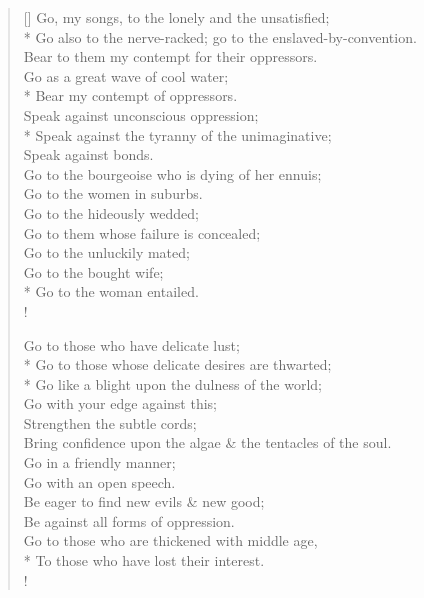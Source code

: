 \documentclass[MAIN]{subfiles}
\begin{document}
\settowidth{\versewidth}{Go also to the nerve-racked; go to the enslaved-by-convention.}
\begin{verse}[\versewidth]
Go, my songs, to the lonely and the unsatisfied;\\*
Go also to the nerve-racked; go to the enslaved-by-convention.\\
Bear to them my contempt for their oppressors.\\
Go as a great wave of cool water;\\*
Bear my contempt of oppressors.\\

Speak against unconscious oppression;\\*
Speak against the tyranny of the unimaginative;\\
Speak against bonds.\\
Go to the {\hge bourgeoise} who is dying of her ennuis;\\
Go to the women in suburbs.\\
Go to the hideously wedded;\\
Go to them whose failure is concealed;\\
Go to the unluckily mated;\\
Go to the bought wife;\\*
Go to the woman entailed.\\!

Go to those who have delicate lust;\\*
Go to those whose delicate desires are thwarted;\\*
Go like a blight upon the dulness of the world;\\
Go with your edge against this;\\
Strengthen the subtle cords;\\
Bring confidence upon the algae \& the tentacles of the soul.\\
Go in a friendly manner;\\
Go with an open speech.\\
Be eager to find new evils \& new good;\\
Be against all forms of oppression.\\
Go to those who are thickened with middle age,\\*
To those who have lost their interest.\\!


\end{verse}
\end{document}
